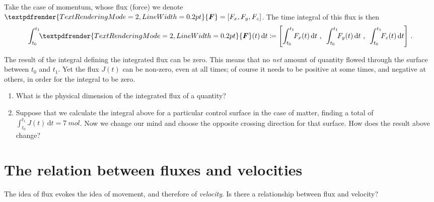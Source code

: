 \documentclass[a4paper,12pt,%
onecolumn,oneside,%
british%
]{memoir}
\renewcommand*{\bm}[1]{\textpdfrender{TextRenderingMode=2,LineWidth=0.2pt}{\boldsymbol{#1}}}
\newcommand*{\di}{\mathrm{d}}%
\newcommand*{\defd}{\coloneqq}
\renewcommand*{\|}[1][]{\nonscript\:#1\vert\nonscript\:\mathopen{}}
\newcommand*{\yti}{t_{0}}
\newcommand*{\ytf}{t_{1}}
\newcommand*{\dt}{\di t}
\newcommand*{\yJ}{J}
\newcommand*{\yF}{\bm{F}}
\begin{document}
Take the case of momentum, whose flux (force) we denote $\yF=[F_{x}, F_{y}, F_{z}]$. The time integral of this flux is then
\begin{equation}
  \label{eq:total_flow_integral_vector}
  \int_{\yti}^{\ytf}\!\! \yF(t)\,\dt \defd
  \Biggl[
  \int_{\yti}^{\ytf}\!\! F_{x}(t)\,\dt \ ,\enskip
  \int_{\yti}^{\ytf}\!\! F_{y}(t)\,\dt \ ,\enskip
  \int_{\yti}^{\ytf}\!\! F_{z}(t)\,\dt
  \Biggr] \ .
\end{equation}

\medskip

\begin{warning}
  The result of the integral defining the integrated flux can be zero. This means that no \emph{net} amount of quantity flowed through the surface between $\yti$ and $\ytf$. Yet the flux $\yJ(t)$ can be non-zero, even at all times; of course it needs to be positive at some times, and negative at others, in order for the integral to be zero.
\end{warning}

\medskip

\begin{exercise}
  \begin{enumerate}[exerc]
  \item What is the physical dimension of the integrated flux of a quantity?
  \item Suppose that we calculate the integral above for a particular control surface in the case of matter, finding a total of $\int_{\yti}^{\ytf}\!\! \yJ(t)\,\dt = \qty{7}{mol}$. Now we change our mind and choose the opposite crossing direction for that surface. How does the result above change?
  \end{enumerate}
\end{exercise}

\section{The relation between fluxes and velocities}
\label{sec:fluxes_velocities}

The idea of flux evokes the idea of movement, and therefore of \emph{velocity}. Is there a relationship between flux and velocity?
\end{document}
